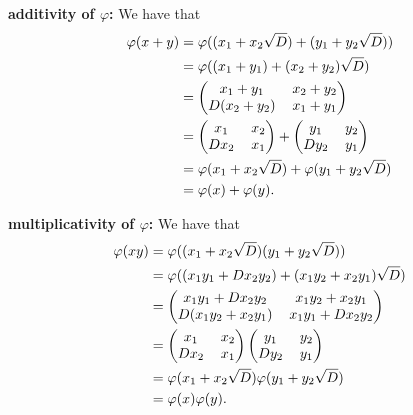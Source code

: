 \begin{enumerate}
\begin{enumerate}
               \textbf{additivity of $\varphi$:} We have that
               \begin{align*}
                  \varphi(x + y)&=\varphi((x_1+x_2\sqrt{D})+(y_1+y_2\sqrt{D}))\\
                     &= \varphi((x_1 + y_1) +(x_2 + y_2)\sqrt{D}) \\
                     &= \left(\begin{tabular}{@{}cc@{}}
                           $x_1 + y_1$ & $x_2 + y_2$ \\
                           $D(x_2 + y_2)$ & $x_1 + y_1$
                     \end{tabular}\right) \\
                     &= \left(\begin{tabular}{@{}cc@{}}
                           $x_1$ & $x_2$ \\
                           $Dx_2$ & $x_1$
                     \end{tabular}\right) + \left(\begin{tabular}{@{}cc@{}}
                           $y_1$ & $y_2$ \\
                           $Dy_2$ & $y_1$
                     \end{tabular}\right) \\
                     &= \varphi(x_1 + x_2\sqrt{D})+\varphi(y_1 + y_2\sqrt{D}) \\
                     &= \varphi(x) + \varphi(y).
               \end{align*}

               \textbf{multiplicativity of $\varphi$:} We have that
               \begin{align*}
                  \varphi(xy) &= \varphi((x_1+x_2\sqrt{D})(y_1+y_2\sqrt{D})) \\
                     &= \varphi((x_1y_1 + Dx_2y_2)+(x_1y_2 + x_2y_1)\sqrt{D}) \\
                     &= \left(\begin{tabular}{@{}cc@{}}
                           $x_1y_1 + Dx_2y_2$ & $x_1y_2 + x_2y_1$ \\
                           $D(x_1y_2 + x_2y_1)$ & $x_1y_1 + Dx_2y_2$
                     \end{tabular}\right) \\
                     &= \left(\begin{tabular}{@{}cc@{}}
                           $x_1$ & $x_2$ \\
                           $Dx_2$ & $x_1$
                     \end{tabular}\right)\left(\begin{tabular}{@{}cc@{}}
                           $y_1$ & $y_2$ \\
                           $Dy_2$ & $y_1$
                     \end{tabular}\right) \\
                     &= \varphi(x_1 + x_2\sqrt{D})\varphi(y_1 + y_2\sqrt{D}) \\
                     &= \varphi(x)\varphi(y).
               \end{align*}


\end{enumerate}
\end{enumerate}
